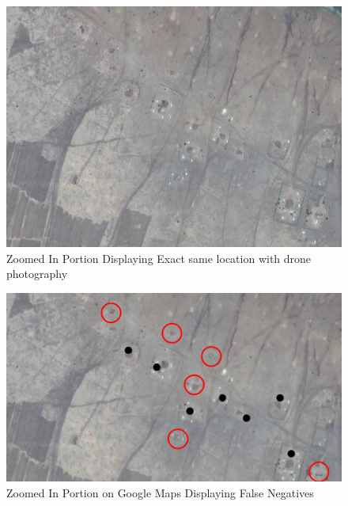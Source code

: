 \documentclass{article}
\begin{document}
\begin{figure}[H]
    \centering
    \includegraphics[width=1\linewidth]{images/zoomed google maps.png}
    \caption{Zoomed In Portion Displaying Exact same location with drone photography}
    \label{fig:enter-label}
\end{figure}

\begin{figure}[H]
    \centering
    \includegraphics[width=1\linewidth]{images/zoomed google maps highlighted.png}
    \caption{Zoomed In Portion on Google Maps Displaying False Negatives}
    \label{fig:zoomed_google_maps}
\end{figure}
\end{document}
